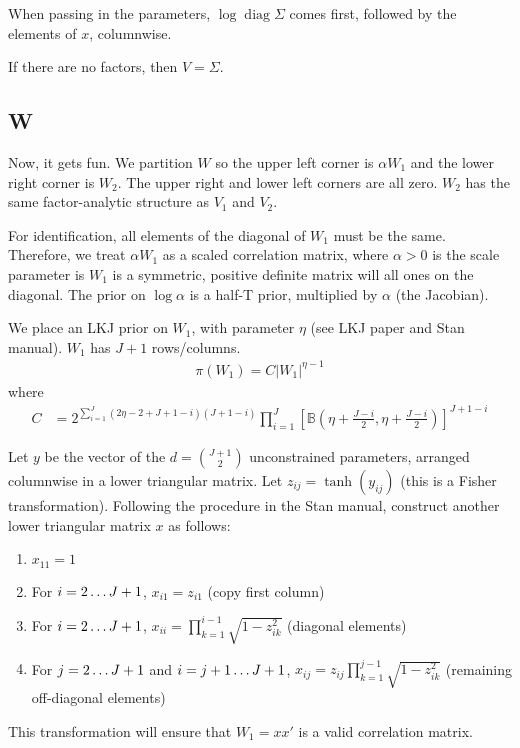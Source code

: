\documentclass[letter,11pt]{article}
\DeclareMathOperator\diag{diag}
\begin{document}
When passing in the parameters, $\log\diag\Sigma$ comes first,
followed by the elements of $x$, columnwise.

If there are no factors, then $V=\Sigma$.

\subsection{W}

Now, it gets fun.  We partition $W$ so the upper left corner is
$\alpha W_1$
and the lower right corner is $W_2$.  The upper right and lower left
corners are all zero.  $W_2$ has the same factor-analytic structure as
$V_1$ and $V_2$.

For identification, all elements of the diagonal of $W_1$ must be the
same.  Therefore, we treat $\alpha W_1$ as a scaled correlation matrix,
where $\alpha>0$ is the scale parameter is $W_1$ is a symmetric, positive definite
matrix will all ones on the diagonal.  The prior on $\log\alpha$ is a
half-T prior, multiplied by $\alpha$ (the Jacobian).

We place an LKJ prior on $W_1$, with parameter $\eta$ (see LKJ paper
and Stan manual).  $W_1$ has $J+1$ rows/columns.
\begin{align}
  \label{eq:6}
\pi(W_1)=C|W_1|^{\eta-1}
\end{align} where
\begin{align}
  C&=2^{\sum_{i=1}^J(2\eta-2+J+1-i)(J+1-i)}
\prod_{i=1}^J\left[\mathbb{B}\left(\eta+\frac{J-i}{2},\eta+\frac{J-i}{2}\right)\right]^{J+1-i}
\end{align}

Let $y$ be the vector of the $d=\binom{J+1}{2}$ unconstrained
parameters, arranged columnwise in a lower triangular matrix.  Let
$z_{ij}=\tanh(y_{ij})$ (this is a Fisher transformation).  Following
the procedure in the Stan manual, construct another lower triangular
matrix $x$ as follows:
\begin{enumerate}
\item $x_{11}=1$
\item For $i=2\mathellipsis J+1$, $x_{i1}=z_{i1}$ (copy first column)
\item For $i=2\mathellipsis J+1$,
  $x_{ii}=\prod_{k=1}^{i-1}\sqrt{1-z_{ik}^2}$ (diagonal elements)
\item For $j=2\mathellipsis J+1$ and $i=j+1\mathellipsis J+1$,
  $x_{ij}=z_{ij}\prod_{k=1}^{j-1}\sqrt{1-z_{ik}^2}$ (remaining
  off-diagonal elements)
\end{enumerate}
This transformation will ensure that $W_1=xx'$ is a valid correlation
matrix.
\end{document}
